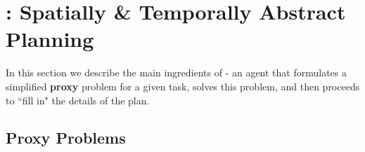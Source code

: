 


\section{\agentshort{}: Spatially \& Temporally Abstract Planning}



In this section we describe the main ingredients of \agentshort{} - an agent that formulates a simplified  \textbf{proxy} problem for a given task, solves this problem, and then proceeds to ``fill in" the details of the plan.  

\subsection{Proxy Problems}

